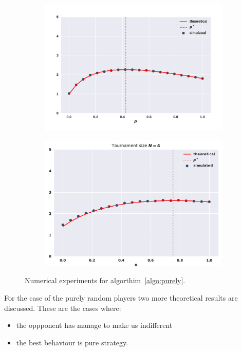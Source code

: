 \documentclass[10pt]{article}
\begin{document}
\begin{figure}
    \centering
    \begin{subfigure}{0.45\textwidth}
        \centering
        \includegraphics[width=.95\textwidth]{img/match_random}
    \end{subfigure}
    \begin{subfigure}{0.45\textwidth}
        \centering
        \includegraphics[width=.85\textwidth]{img/tournament_random}
    \end{subfigure}
    \caption{Numerical experiments for algorthim~\ref{algo:purely}.}
    \label{fig:purely_random_results}
\end{figure}

For the case of the purely random players two more theoretical results are discussed.
These are the cases where:

\begin{itemize}
    \item the oppponent has manage to make us indifferent
    \item the best behaviour is pure strategy.
\end{itemize}
\end{document}
